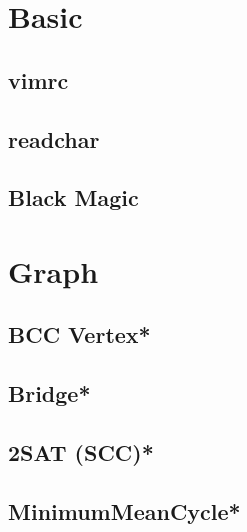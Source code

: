 \section{Basic}
%
%
\subsection{vimrc}

\subsection{readchar}

\subsection{Black Magic}

% 


\section{Graph}
\subsection{BCC Vertex*} %

\subsection{Bridge*} %

\subsection{2SAT (SCC)*} %

\subsection{MinimumMeanCycle*} %

